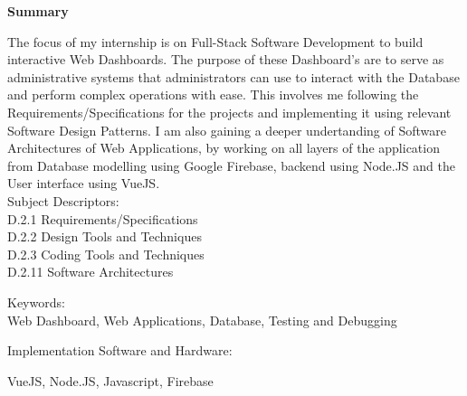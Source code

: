 \begin{center}
	\Large\textbf{Summary}
\end{center}
\noindent
The focus of my internship is on Full-Stack Software Development to build interactive Web Dashboards.
The purpose of these Dashboard's are to serve as administrative systems that administrators can use to interact
with the Database and perform complex operations with ease.
This involves me following the Requirements/Specifications for the projects and implementing it using relevant Software Design Patterns.
I am also gaining a deeper undertanding of Software Architectures of Web Applications, by working on all layers of the application from
Database modelling using Google Firebase, backend using Node.JS and the User interface using VueJS.
\\

\noindent
Subject Descriptors:\\
\indent D.2.1  Requirements/Specifications\\
\indent D.2.2  Design Tools and Techniques\\
\indent D.2.3  Coding Tools and Techniques\\
\indent D.2.11 Software Architectures

\noindent
Keywords:\\
\indent Web Dashboard, Web Applications, Database, Testing and Debugging

\noindent
Implementation Software and Hardware:

\indent VueJS, Node.JS, Javascript, Firebase